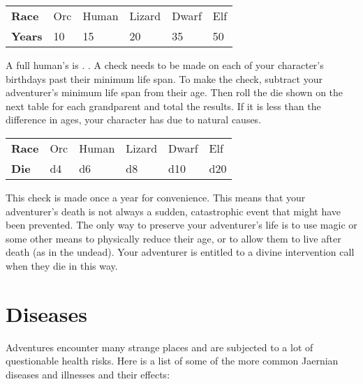 \begin{multicols*}{2}
\begin{normbox}
\begin{tabular}{@{}l l l l l l}
\textbf{Race} & Orc & Human & Lizard & Dwarf & Elf\\
\textbf{Years} & 10 & 15 & 20 & 35 & 50\\
\end{tabular}
\end{normbox}

A full human's  is . . A check needs to be made on each of your character's birthdays past their minimum life span. To make the check, subtract your adventurer's minimum life span from their age. Then roll the die shown on the next table for each grandparent and total the results. If it is less than the difference in ages, your character has  due to natural causes.
\begin{normbox}
\begin{tabular}{@{}l l l l l l}
\textbf{Race} & Orc & Human & Lizard & Dwarf & Elf\\
\textbf{Die} & d4 & d6 & d8 & d10 & d20\\
\end{tabular}
\end{normbox}



This check is made once a year for convenience. This means that your adventurer's death is not always a sudden, catastrophic event that might have been prevented. The only way to preserve your adventurer's life is to use magic or some other means to physically reduce their age, or to allow them to live after death (as in the undead). Your adventurer is entitled to a divine intervention call when they die in this way.
\section{Diseases}
Adventures encounter many strange places and are subjected to a lot of questionable health risks. Here is a list of some of the more common Jaernian diseases and illnesses and their effects:


\end{multicols*}
